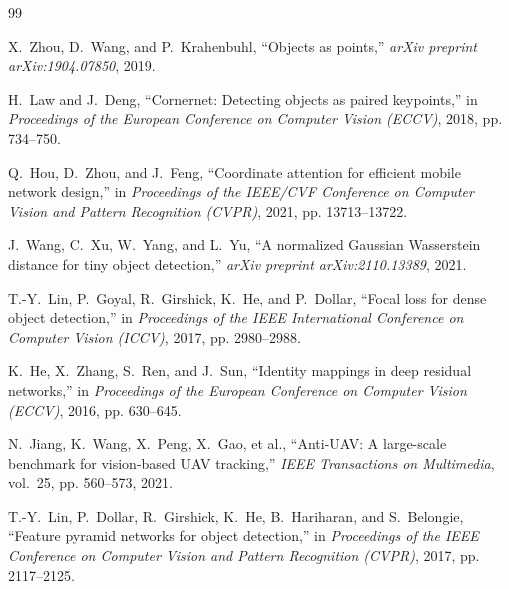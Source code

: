 \documentclass[11pt,a4paper]{article}
\begin{document}
\clearpage
\begingroup
\renewcommand{\refname}{Tài liệu tham khảo}
\begin{thebibliography}{99}

X.~Zhou, D.~Wang, and P.~Krahenbuhl, ``Objects as points,'' \emph{arXiv preprint arXiv:1904.07850}, 2019.

H.~Law and J.~Deng, ``Cornernet: Detecting objects as paired keypoints,'' in \emph{Proceedings of the European Conference on Computer Vision (ECCV)}, 2018, pp. 734--750.

Q.~Hou, D.~Zhou, and J.~Feng, ``Coordinate attention for efficient mobile network design,'' in \emph{Proceedings of the IEEE/CVF Conference on Computer Vision and Pattern Recognition (CVPR)}, 2021, pp. 13713--13722.

J.~Wang, C.~Xu, W.~Yang, and L.~Yu, ``A normalized Gaussian Wasserstein distance for tiny object detection,'' \emph{arXiv preprint arXiv:2110.13389}, 2021.

T.-Y.~Lin, P.~Goyal, R.~Girshick, K.~He, and P.~Dollar, ``Focal loss for dense object detection,'' in \emph{Proceedings of the IEEE International Conference on Computer Vision (ICCV)}, 2017, pp. 2980--2988.

K.~He, X.~Zhang, S.~Ren, and J.~Sun, ``Identity mappings in deep residual networks,'' in \emph{Proceedings of the European Conference on Computer Vision (ECCV)}, 2016, pp. 630--645.

N.~Jiang, K.~Wang, X.~Peng, X.~Gao, et al., ``Anti-UAV: A large-scale benchmark for vision-based UAV tracking,'' \emph{IEEE Transactions on Multimedia}, vol.~25, pp. 560--573, 2021.

T.-Y.~Lin, P.~Dollar, R.~Girshick, K.~He, B.~Hariharan, and S.~Belongie, ``Feature pyramid networks for object detection,'' in \emph{Proceedings of the IEEE Conference on Computer Vision and Pattern Recognition (CVPR)}, 2017, pp. 2117--2125.

\end{thebibliography}
\endgroup
\end{document}

